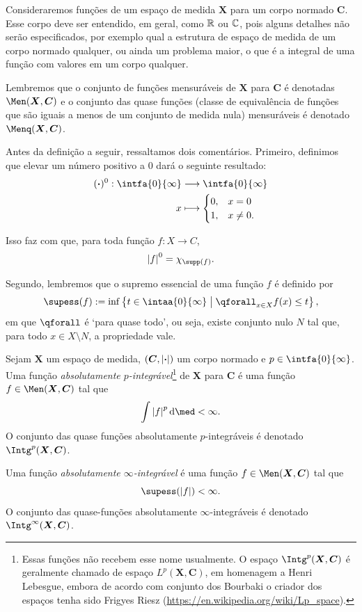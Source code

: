 Consideraremos funções de um espaço de medida $\bm X$ para um corpo normado $\bm C$. Esse corpo deve ser entendido, em geral, como $\mathbb{R}$ ou $\mathbb{C}$, pois alguns detalhes não serão especificados, por exemplo qual a estrutura de espaço de medida de um corpo normado qualquer, ou ainda um problema maior, o que é a integral de uma função com valores em um corpo qualquer.

Lembremos que o conjunto de funções mensuráveis de $\bm X$ para $\bm C$ é denotadas $\Men(\bm X,\bm C)$ e o conjunto das quase funções (classe de equivalência de funções que são iguais a menos de um conjunto de medida nula) mensuráveis é denotado $\Menq(\bm X,\bm C)$.

Antes da definição a seguir, ressaltamos dois comentários. Primeiro, definimos que elevar um número positivo a $0$ dará o seguinte resultado:
	\begin{align*}
	\func{(\var)^0}{\intfa{0}{\infty}}{\intfa{0}{\infty}}{x}{
		\begin{cases}
			0,& x=0 \\
			1,& x \neq 0.
		\end{cases}
	}
	\end{align*}

Isso faz com que, para toda função $f\colon X \to C$,
	\begin{equation*}
	\abs{f}^0 = \idc_{\supp(f)}.
	\end{equation*}

Segundo, lembremos que o supremo essencial de uma função $f$ é definido por
	\begin{equation*}
	\supess (f) := \inf \set{t \in \intaa{0}{\infty}}{\qforall_{x \in X} f(x) \leq t},
	\end{equation*}
em que $\qforall$ é `para quase todo', ou seja, existe conjunto nulo $N$ tal que, para todo $x \in X \setminus N$, a propriedade vale.

\begin{defi}
Sejam $\bm X$ um espaço de medida, $(\bm C,\left\vert{\bm{\cdot}}\right\vert)$ um corpo normado e $p \in \intfa{0}{\infty}$. Uma função \emph{absolutamente $p$-integrável}\footnote{Essas funções não recebem esse nome usualmente. O espaço $\Intg^p(\bm X,\bm C)$ é geralmente chamado de espaço $L^p(\bm X,\bm C)$, em homenagem a Henri Lebesgue, embora de acordo com conjunto dos Bourbaki o criador dos espaços tenha sido Frigyes Riesz (\url{https://en.wikipedia.org/wiki/Lp_space}).} de $\bm X$ para $\bm C$ é uma função $f \in \Men(\bm X,\bm C)$ tal que
	\begin{equation*}
	\int \abs{f}^p \dd\med < \infty.
	\end{equation*}
O conjunto das quase funções absolutamente $p$-integráveis é denotado $\Intg^p(\bm X,\bm C)$.

Uma função \emph{absolutamente $\infty$-integrável} é uma função $f \in \Men(\bm X,\bm C)$ tal que
	\begin{equation*}
	\supess(\abs{f}) < \infty.
	\end{equation*}
O conjunto das quase-funções absolutamente $\infty$-integráveis é denotado $\Intg^\infty(\bm X,\bm C)$.
\end{defi}

